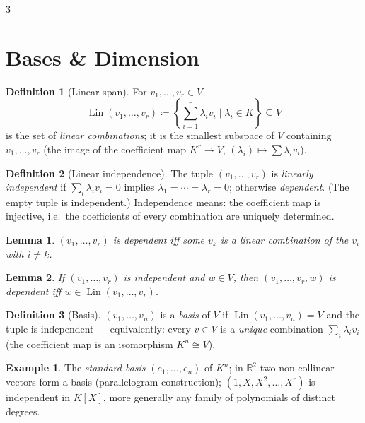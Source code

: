 \documentclass[10pt,a4paper,landscape]{article}
\theoremstyle{definition}
\newtheorem{defn}{Definition}[section]
\newtheorem{exm}{Example}[section]
\theoremstyle{plain}
\newtheorem{lem}{Lemma}[section]
\theoremstyle{remark}
\newcommand{\R}{\mathbb{R}}
\newcommand{\set}[1]{\left\{ #1 \right\}}
\newcommand{\deq}{\coloneqq}
\DeclareMathOperator{\Lin}{Lin}
\begin{document}
\begin{multicols*}{3}
\section{Bases \& Dimension}

\begin{defn}[Linear span]
For $v_1, \dots, v_r \in V$,
\[
\Lin(v_1, \dots, v_r) \deq \set{\textstyle\sum_{i=1}^r \lambda_i v_i \mid \lambda_i \in K} \subseteq V
\]
is the set of \emph{linear combinations}; it is the smallest subspace of $V$ containing $v_1, \dots, v_r$ (the image of the coefficient map $K^r \to V$, $(\lambda_i) \mapsto \sum \lambda_i v_i$).
\end{defn}

\begin{defn}[Linear independence]
The tuple $(v_1, \dots, v_r)$ is \emph{linearly independent} if $\sum_i \lambda_i v_i = 0$ implies $\lambda_1 = \cdots = \lambda_r = 0$; otherwise \emph{dependent}. (The empty tuple is independent.) Independence means: the coefficient map is injective, i.e.\ the coefficients of every combination are uniquely determined.
\end{defn}

\begin{lem}
$(v_1, \dots, v_r)$ is dependent iff some $v_k$ is a linear combination of the $v_i$ with $i \neq k$.
\end{lem}

\begin{lem}
If $(v_1, \dots, v_r)$ is independent and $w \in V$, then $(v_1, \dots, v_r, w)$ is dependent iff $w \in \Lin(v_1, \dots, v_r)$.
\end{lem}

\begin{defn}[Basis]
$(v_1, \dots, v_n)$ is a \emph{basis} of $V$ if $\Lin(v_1, \dots, v_n) = V$ and the tuple is independent --- equivalently: every $v \in V$ is a \emph{unique} combination $\sum_i \lambda_i v_i$ (the coefficient map is an isomorphism $K^n \cong V$).
\end{defn}

\begin{exm}
The \emph{standard basis} $(e_1, \dots, e_n)$ of $K^n$; in $\R^2$ two non-collinear vectors form a basis (parallelogram construction); $(1, X, X^2, \dots, X^r)$ is independent in $K[X]$, more generally any family of polynomials of distinct degrees.
\end{exm}


\end{multicols*}
\end{document}
